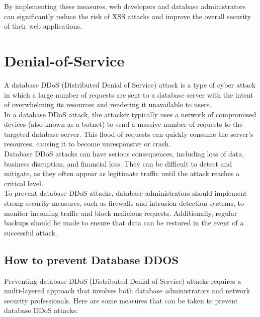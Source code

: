 \documentclass[11pt]{article}
\let\oldsection\section
\renewcommand\section{\clearpage\oldsection}
\begin{document}
By implementing these measures, web developers and database administrators can significantly reduce the risk of XSS attacks and improve the overall security of their web applications.\\

\section{Denial-of-Service}
\label{sec:org1b9a720}

A database DDoS (Distributed Denial of Service) attack is a type of cyber attack in which a large number of requests are sent to a database server with the intent of overwhelming its resources and rendering it unavailable to users.\\

In a database DDoS attack, the attacker typically uses a network of compromised devices (also known as a botnet) to send a massive number of requests to the targeted database server. This flood of requests can quickly consume the server's resources, causing it to become unresponsive or crash.\\

Database DDoS attacks can have serious consequences, including loss of data, business disruption, and financial loss. They can be difficult to detect and mitigate, as they often appear as legitimate traffic until the attack reaches a critical level.\\

To prevent database DDoS attacks, database administrators should implement strong security measures, such as firewalls and intrusion detection systems, to monitor incoming traffic and block malicious requests. Additionally, regular backups should be made to ensure that data can be restored in the event of a successful attack.\\

\subsection{How to prevent Database DDOS}
\label{sec:orga87a604}

Preventing database DDoS (Distributed Denial of Service) attacks requires a multi-layered approach that involves both database administrators and network security professionals. Here are some measures that can be taken to prevent database DDoS attacks:\\
\end{document}
